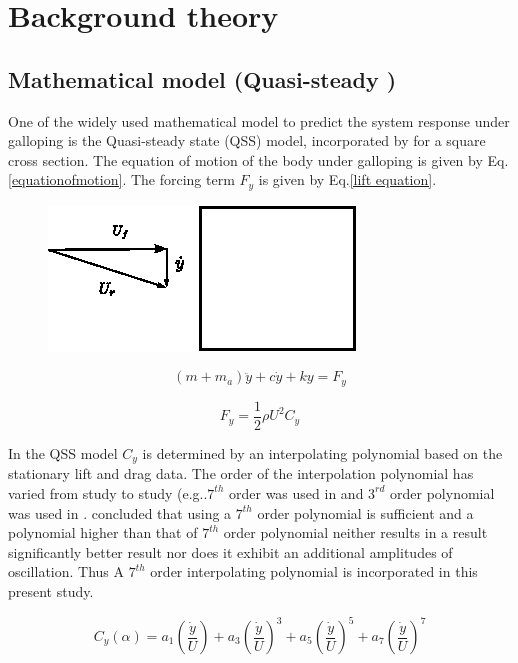 
\section{Background theory}

\subsection{Mathematical model (Quasi-steady )}

 One of the widely used mathematical model to predict the system response under galloping is the Quasi-steady state (QSS) model, incorporated by \cite{Parkinson1964} for a square cross section. The equation of motion of the body under galloping is given by Eq. \eqref{equationofmotion}. The forcing term $F_y$ is given by Eq.\eqref{lift equation}.
 
 \begin{figure}
\centering
\includegraphics[width=0.5\linewidth]{../FnP/setup_1}
\caption{}
\label{fig:setup_1}
\end{figure}


\begin{equation}
\label{equationofmotion}
(m+m_a)\ddot{y}+c\dot{y}+ky=F_y
\end{equation}

\begin{equation}
\label{lift equation}
F_y=\frac{1}{2}\rho U^2C_y
\end{equation}

 In the QSS  model $C_y$ is determined by an interpolating polynomial based on the stationary lift and drag data. The order of the interpolation polynomial has varied from study to study (e.g..$7^{th}$ order was used in \cite{Parkinson1964} and $3^{rd}$ order polynomial was used in \cite{Barrero-Gil2009}. \cite{Ng2005} concluded that using a $7^{th}$ order polynomial is sufficient and a polynomial higher than that of $7^{th}$ order polynomial neither results in a result significantly better result nor does it exhibit an additional amplitudes of oscillation. Thus A $7 ^{th}$ order interpolating polynomial is incorporated in this present study. 

\begin{equation}
\label{cy ploynomial}
C_y(\alpha)=a_1\left(\frac{\dot{y}}{U}\right)+a_3\left(\frac{\dot{y}}{U}\right)^3+a_5\left(\frac{\dot{y}}{U}\right)^5+a_7\left(\frac{\dot{y}}{U}\right)^7
\end{equation}

